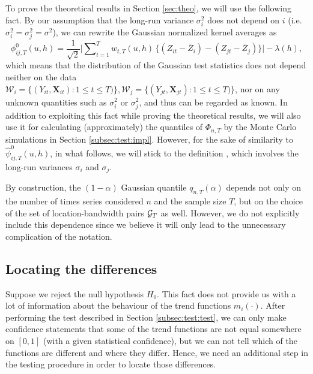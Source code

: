 \documentclass[a4paper,12pt]{article}
\makeatletter
\renewcommand{\eqref}[1]{\tagform@{\ref{#1}}}
\makeatother
\begin{document}
\begin{remark}
To prove the theoretical results in Section \ref{sec:theo}, we will use the following fact. By our assumption that the long-run variance $\sigma_i^2$ does not depend on $i$ \linebreak (i.e. $\sigma_i^2 = \sigma^2_j = \sigma^2$), we can rewrite the Gaussian normalized kernel averages \eqref{eq:phi_zero_ij} as
\[\phi^0_{ij,T}(u, h) = \frac{1}{\sqrt{2}} \Big|\sum\nolimits_{t=1}^T w_{t,T}(u,h) \, \big\{ (Z_{it} - \bar{Z}_i) - (Z_{jt} - \bar{Z}_j) \big\}\Big| - \lambda(h), \] 
which means that the distribution of the Gaussian test statistics does not depend neither on the data $\mathcal{W}_i =\{ (Y_{it}, \mathbf{X}_{it}) : 1\leq t \leq T)\}, \mathcal{W}_j =\{ (Y_{jt}, \mathbf{X}_{jt}) : 1\leq t \leq T)\}$, nor on any unknown quantities such as $\sigma^2_i$ or $\sigma_j^2$, and thus can be regarded as known. In addition to exploiting this fact while proving the theoretical results, we will also use it for calculating (approximately) the quantiles of $\Phi_{n, T}$ by the Monte Carlo simulations in Section \ref{subsec:test:impl}. However, for the sake of similarity to $\hat{\psi}^0_{ij,T}(u, h)$, in what follows, we will stick to the definition \eqref{eq:phi_zero_ij}, which involves the long-run variances $\sigma_i$ and $\sigma_j$.
\end{remark}

\begin{remark}
By construction, the $(1-\alpha)$ Gaussian quantile $q_{n, T}(\alpha)$ depends not only on the number of times series considered $n$ and the sample size $T$, but on the choice of the set of location-bandwidth pairs $\mathcal{G}_T$ as well. However, we do not explicitly include this dependence since we believe it will only lead to the unnecessary complication of the notation. 
\end{remark}

\subsection{Locating the differences}\label{subsec:test:loc}

Suppose we reject the null hypothesis $H_0$. This fact does not provide us with a lot of information about the behaviour of the trend functions $m_i(\cdot)$. After performing the test described in Section \ref{subsec:test:test}, we can only make confidence statements that some of the trend functions are not equal somewhere on $[0, 1]$ (with a given statistical confidence), but we can not tell which of the functions are different and where they differ. Hence, we need an additional step in the testing procedure in order to locate those differences.
\end{document}
